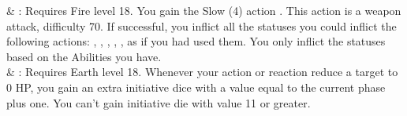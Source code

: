 \begin{tabjob}
     & %
    : Requires Fire level 18. You gain the Slow (4) action . This action is a weapon attack, difficulty 70. If successful, you inflict all the statuses you could inflict the following actions: , , , , , as if you had used them. You only inflict the statuses based on the Abilities you have. \\
     & %
    : Requires Earth level 18. Whenever your action or reaction reduce a target to 0 HP, you gain an extra initiative dice with a value equal to the current phase plus one. You can’t gain initiative die with value 11 or greater. \\
\end{tabjob}
